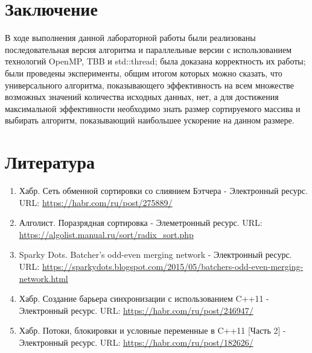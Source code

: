 \documentclass{report}
\begin{document}
\newpage

\section*{Заключение}
\par В ходе выполнения данной лабораторной работы были реализованы последовательная версия алгоритма и параллельные версии с использованием технологий OpenMP, TBB и std::thread; была доказана корректность их работы; были проведены эксперименты, общим итогом которых можно сказать, что универсального алгоритма, показывающего эффективность на всем множестве возможных значений количества исходных данных, нет, а для достижения максимальной эффективности необходимо знать размер сортируемого массива и выбирать алгоритм, показывающий наибольшее ускорение на данном размере. 

\newpage

\section*{Литература}
\begin{enumerate}
    \item Хабр. Сеть обменной сортировки со слиянием Бэтчера - Электронный ресурс. URL: \newline
    \url{https://habr.com/ru/post/275889/}
    \item Алголист. Поразрядная сортировка - Элеметронный ресурс. URL: \newline
    \url{https://algolist.manual.ru/sort/radix_sort.php}
    \item Sparky Dots. Batcher's odd-even merging network - Электронный ресурс. URL: \newline
    \url{https://sparkydots.blogspot.com/2015/05/batchers-odd-even-merging-network.html}
    \item Хабр. Создание барьера синхронизации с использованием C++11 - Электронный ресурс. URL: \newline
    \url{https://habr.com/ru/post/246947/}
    \item Хабр. Потоки, блокировки и условные переменные в C++11 [Часть 2] - Электронный ресурс. URL: \newline
    \url{https://habr.com/ru/post/182626/}
\end{enumerate}
\newpage

\end{document}
